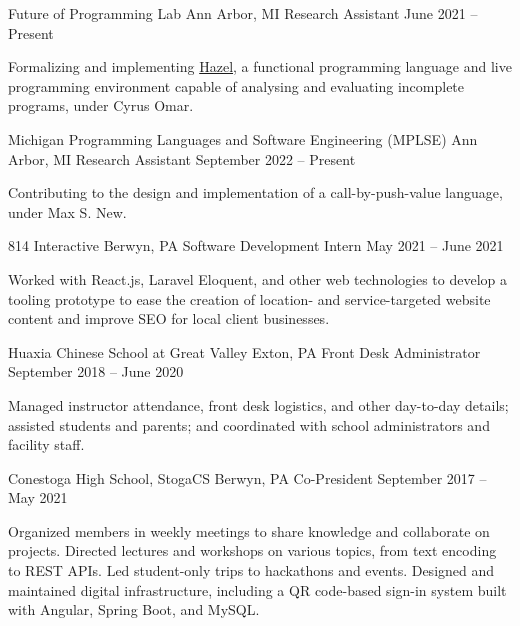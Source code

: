 \documentclass[letterpaper,11pt]{article}
\begin{document}
  \begin{rsectionlist}
    \rsectionitem
      {Future of Programming Lab}
      {Ann Arbor, MI}
      {Research Assistant}
      {June 2021 -- Present}
      
      Formalizing and implementing \href{https://hazel.org}{Hazel}, a functional programming
      language and live programming environment capable of analysing and evaluating incomplete
      programs, under Cyrus Omar.

      \begin{rpointlist}
      \end{rpointlist}

    \rsectionitem
      {Michigan Programming Languages and Software Engineering (MPLSE)}
      {Ann Arbor, MI}
      {Research Assistant}
      {September 2022 -- Present}

      Contributing to the design and implementation of a call-by-push-value language, under Max S.
      New.

    \rsectionitem
      {814 Interactive}
      {Berwyn, PA}
      {Software Development Intern}
      {May 2021 -- June 2021}

      Worked with React.js, Laravel Eloquent, and other web technologies to develop a tooling
      prototype to ease the creation of location- and service-targeted website content and improve
      SEO for local client businesses.

    \rsectionitem
      {Huaxia Chinese School at Great Valley}
      {Exton, PA}
      {Front Desk Administrator}
      {September 2018 -- June 2020}

      Managed instructor attendance, front desk logistics, and other day-to-day details; assisted
      students and parents; and coordinated with school administrators and facility staff.

    \rsectionitem
      {Conestoga High School, StogaCS}
      {Berwyn, PA}
      {Co-President}
      {September 2017 -- May 2021}

      Organized members in weekly meetings to share knowledge and collaborate on projects. Directed
      lectures and workshops on various topics, from text encoding to REST APIs. Led student-only
      trips to hackathons and events. Designed and maintained digital infrastructure, including a QR
      code-based sign-in system built with Angular, Spring Boot, and MySQL.
  \end{rsectionlist}
\end{document}
